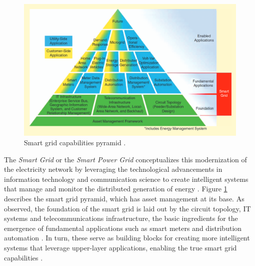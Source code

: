 \begin{figure}[H]
	\centering
	\includegraphics[width=0.90\linewidth]{./figures/smart_grid.png}
	\caption{Smart grid capabilities pyramid \cite{farhangiPathSmartGrid2010}.}
	\label{fig:smart-grid}
\end{figure}


The \textit{Smart Grid} or the \textit{Smart Power Grid} conceptualizes this modernization of the electricity network by leveraging the technological advancements in information technology and communication science to create intelligent systems that manage and monitor the distributed generation of energy \cite{bayindirSmartGridTechnologies2016, farhangiPathSmartGrid2010}. Figure \ref{fig:smart-grid} describes the smart grid pyramid, which has asset management at its base. As observed, the foundation of the smart grid is laid out by the circuit topology, \acs{IT} systems and telecommunications infrastructure, the basic ingredients for the emergence of fundamental applications such as smart meters and distribution automation \cite{farhangiPathSmartGrid2010}. In turn, these serve as building blocks for creating more intelligent systems that leverage upper-layer applications, enabling the true smart grid capabilities \cite{farhangiPathSmartGrid2010}.
